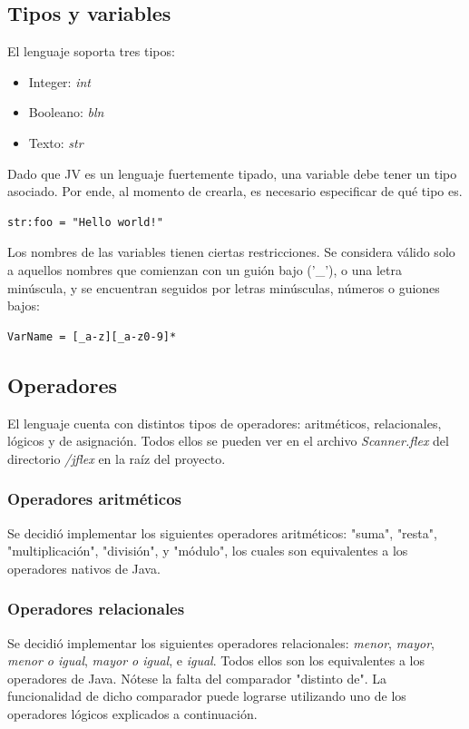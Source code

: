 \documentclass[spanish]{article}
\begin{document}
        \subsection{Tipos y variables}
            \par El lenguaje soporta tres tipos:
            \begin{itemize}
                \item Integer: \textit{int}
                \item Booleano: \textit{bln}
                \item Texto: \textit{str}
            \end{itemize}
            \par Dado que JV es un lenguaje fuertemente tipado, una variable debe tener un tipo asociado. Por ende, al momento de crearla, es necesario especificar de qué tipo es.
            \begin{lstlisting}
str:foo = "Hello world!"
            \end{lstlisting}
            \par Los nombres de las variables tienen ciertas restricciones. Se considera válido solo a aquellos nombres que comienzan con un guión bajo ('\_'), o una letra minúscula, y se encuentran seguidos por letras minúsculas, números o guiones bajos:
            \begin{lstlisting}
VarName = [_a-z][_a-z0-9]*
            \end{lstlisting}

        \subsection{Operadores}
            \par El lenguaje cuenta con distintos tipos de operadores: aritméticos, relacionales, lógicos y de asignación. Todos ellos se pueden ver en el archivo \textit{Scanner.flex} del directorio \textit{/jflex} en la raíz del proyecto.
            \subsubsection{Operadores aritméticos}
                \par Se decidió implementar los siguientes operadores aritméticos: "suma", "resta", "multiplicación", "división", y "módulo", los cuales son equivalentes a los operadores nativos de Java.
            \subsubsection{Operadores relacionales}
                \par Se decidió implementar los siguientes operadores relacionales: \textit{menor}, \textit{mayor}, \textit{menor o igual}, \textit{mayor o igual}, e \textit{igual}. Todos ellos son los equivalentes a los operadores de Java. Nótese la falta del comparador "distinto de". La funcionalidad de dicho comparador puede lograrse utilizando uno de los operadores lógicos explicados a continuación.
\end{document}
